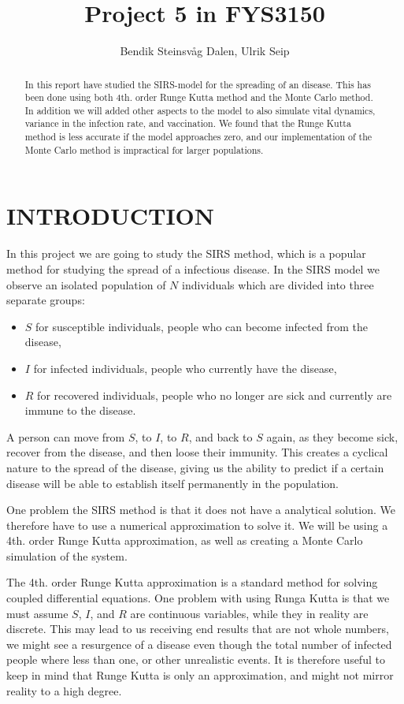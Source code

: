 \documentclass[a4paper]{article}
\title{Project 5 in FYS3150}
\author{Bendik Steinsvåg Dalen, Ulrik Seip}
\let\Oldsection\section
\renewcommand{\section}{\FloatBarrier\Oldsection}
\begin{document}
	\maketitle
	
	
	\begin{abstract}
		In this report have studied the SIRS-model for the spreading of an disease. This has been done using both 4th. order Runge Kutta method and the Monte Carlo method. In addition we will added other aspects to the model to also simulate vital dynamics, variance in the infection rate, and vaccination. We found that the Runge Kutta method is less accurate if the model approaches zero, and our implementation of the Monte Carlo method is impractical for larger populations.
	\end{abstract}
	
	
	\section{INTRODUCTION}
	
	
	In this project we are going to study the SIRS method, which is a popular method for studying the spread of a infectious disease. In the SIRS model we observe an isolated population of $N$ individuals which are divided into three separate groups:
	\begin{itemize}
		\item $S$ for susceptible individuals, people who can become infected from the disease,
		\item $I$ for infected individuals, people who currently have the disease,
		\item $R$ for recovered individuals, people who no longer are sick and currently are immune to the disease.
	\end{itemize}
	A person can move from $S$, to $I$, to $R$, and back to $S$ again, as they become sick, recover from the disease, and then loose their immunity. This creates a cyclical nature to the spread of the disease, giving us the ability to predict if a certain disease will be able to establish itself permanently in the population. 
	
	One problem the SIRS method is that it does not have a analytical solution. We therefore have to use a numerical approximation to solve it. We will be using a 4th. order Runge Kutta approximation, as well as creating a Monte Carlo simulation of the system.
	
	The 4th. order Runge Kutta approximation is a standard method for solving coupled differential equations. One problem with using Runga Kutta is that we must assume $S$, $I$, and $R$ are continuous variables, while they in reality are discrete. This may lead to us receiving end results that are not whole numbers, we might see a resurgence of a disease even though the total number of infected people where less than one, or other unrealistic events. It is therefore useful to keep in mind that Runge Kutta is only an approximation, and might not mirror reality to a high degree. 
	
\end{document}
